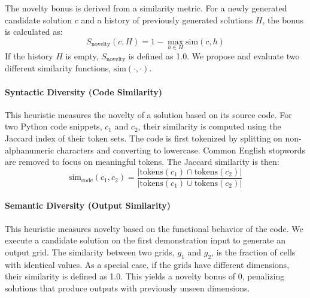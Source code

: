 \documentclass{article} %
\begin{document}
The novelty bonus is derived from a similarity metric. For a newly generated candidate solution $c$ and a history of previously generated solutions $H$, the bonus is calculated as:
\begin{equation} \label{eq:novelty_bonus}
S_{\text{novelty}}(c, H) = 1 - \max_{h \in H} \text{sim}(c, h)
\end{equation}
If the history $H$ is empty, $S_{\text{novelty}}$ is defined as 1.0. We propose and evaluate two different similarity functions, $\text{sim}(\cdot, \cdot)$.

\paragraph{Syntactic Diversity (Code Similarity)} This heuristic measures the novelty of a solution based on its source code. For two Python code snippets, $c_1$ and $c_2$, their similarity is computed using the Jaccard index of their token sets. The code is first tokenized by splitting on non-alphanumeric characters and converting to lowercase. Common English stopwords are removed to focus on meaningful tokens. The Jaccard similarity is then:
\begin{equation} \label{eq:jaccard}
\text{sim}_{\text{code}}(c_1, c_2) = \frac{|\text{tokens}(c_1) \cap \text{tokens}(c_2)|}{|\text{tokens}(c_1) \cup \text{tokens}(c_2)|}
\end{equation}

\paragraph{Semantic Diversity (Output Similarity)} This heuristic measures novelty based on the functional behavior of the code. We execute a candidate solution on the first demonstration input to generate an output grid. The similarity between two grids, $g_1$ and $g_2$, is the fraction of cells with identical values. As a special case, if the grids have different dimensions, their similarity is defined as 1.0. This yields a novelty bonus of 0, penalizing solutions that produce outputs with previously unseen dimensions.

\end{document}
